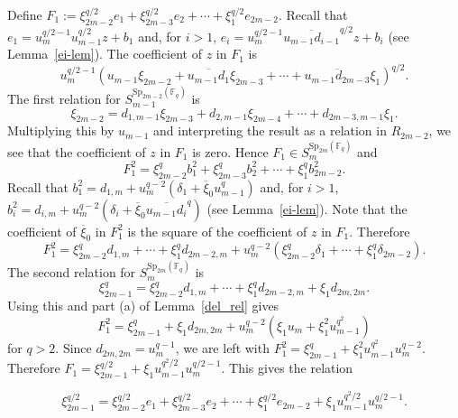\documentclass{amsart}
\newcommand{\field}{\mathbb{F}}
\newcommand{\syp}[2]{{{\text{Sp}_{{#1}}(\field_{#2})}}}
\begin{document}
Define $F_1:=\xi_{2m-2}^{q/2} e_1+\xi_{2m-3}^{q/2} e_2+\cdots  +\xi_{1}^{q/2} e_{2m-2}$.
Recall that $e_1=u_m^{q/2-1}u_{m-1}^{q/2}z+b_1$ and, for $i>1$,
$e_i=u_m^{q/2-1}\overline{u_{m-1}d_{i-1}}^{q/2}z+b_i$ (see Lemma~\ref{ei-lem}). 
The coefficient of $z$ in $F_1$ is
$$u_m^{q/2-1}\left(u_{m-1}\xi_{2m-2}+\overline{u_{m-1}d_1}\xi_{2m-3}+\cdots +\overline{u_{m-1}d_{2m-3}}\xi_1\right)^{q/2}.$$
The first relation for $S_{m-1}^{\syp{2m-2}{q}}$ is
$$\xi_{2m-2}=d_{1,m-1}\xi_{2m-3}+d_{2,m-1}\xi_{2m-4}+\cdots +d_{2m-3,m-1}\xi_1.$$
Multiplying this by $u_{m-1}$ and interpreting the result as a relation in $R_{2m-2}$, we see that the coefficient of $z$ in $F_1$ is zero. 
Hence $F_1\in S_{m}^{\syp{2m}{q}}$ and
$$F_1^2=\xi_{2m-2}^{q} b^2_1+\xi_{2m-3}^{q} b^2_2+\cdots  +\xi_{1}^{q} b^2_{2m-2}.$$
Recall that $b_1^2=d_{1,m}+u_m^{q-2}(\delta_1+\overline{\xi}_0u_{m-1}^q)$ and, for $i>1$,\
$b_i^2=d_{i,m}+u_m^{q-2}(\delta_i+\overline{\xi}_0\overline{u_{m-1}d_i}^q)$ (see Lemma~\ref{ei-lem}).
Note that the coefficient of $\overline{\xi}_0$ in $F_1^2$ is the square of the coefficient of $z$ in $F_1$.
Therefore $$F_1^2=\xi_{2m-2}^{q} d_{1,m}+\cdots  +\xi_{1}^{q} d_{2m-2,m}
+u_m^{q-2}(\xi_{2m-2}^{q} \delta_1+\cdots  +\xi_{1}^{q} \delta_{2m-2}).$$
The second relation for $S_{m}^{\syp{2m}{q}}$ is
$$\xi^q_{2m-1}=\xi_{2m-2}^{q} d_{1,m}+\cdots  +\xi_{1}^{q} d_{2m-2,m}+\xi_1d_{2m,2m}.$$
Using this and part (a) of Lemma~\ref{del_rel} gives
$$F_1^2=\xi_{2m-1}^q+\xi_1 d_{2m,2m}+u_m^{q-2}(\xi_1u_m+\xi_1^2u_{m-1}^{q^2})$$
for $q>2$.
Since $d_{2m,2m}=u_m^{q-1}$, we are left with $F_1^2=\xi_{2m-1}^q+\xi_1^2u_{m-1}^{q^2}u_m^{q-2}$.
Therefore $F_1=\xi_{2m-1}^{q/2}+\xi_1u_{m-1}^{q^2/2}u_m^{q/2-1}$. This gives the relation

\begin{equation}\label{Oodd-eqn1}
\xi_{2m-1}^{q/2}=\xi_{2m-2}^{q/2}e_1+\xi_{2m-3}^{q/2}e_2+\cdots +\xi_{1}^{q/2}e_{2m-2}
+\xi_1u_{m-1}^{q^2/2}u_m^{q/2-1}.
\end{equation}
\end{document}
